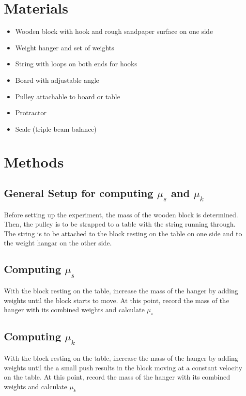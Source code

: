 \documentclass[12pt]{article}
\begin{document}
    \section{Materials}
        \begin{itemize}
            \item Wooden block with hook and rough sandpaper surface on one side
            \item Weight hanger and set of weights
            \item String with loops on both ends for hooks
            \item Board with adjustable angle
            \item Pulley attachable to board or table
            \item Protractor
            \item Scale (triple beam balance)
        \end{itemize}

    \section{Methods}
        \subsection{General Setup for computing $\mu_s$ and $\mu_k$}
            Before setting up the experiment, the mass of the wooden block is 
            determined. Then, the pulley is to be strapped to a table with the
            string running through. The string is to be attached to the block
            resting on the table on one side and to the weight hangar on the 
            other side.
        \subsection{Computing $\mu_s$}
            With the block resting on the table, increase the mass of
            the hanger by adding weights until the block starts to move.
            At this point, record the mass of the hanger with its combined 
            weights and calculate $\mu_s$
        \subsection{Computing $\mu_k$}
            With the block resting on the table, increase the mass of
            the hanger by adding weights until the a small push results
            in the block moving at a constant velocity on the table.
            At this point, record the mass of the hanger with its combined 
            weights and calculate $\mu_k$
\end{document}
